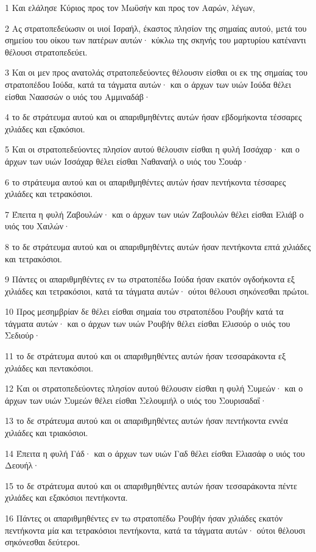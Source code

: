 \par 1 Και ελάλησε Κύριος προς τον Μωϋσήν και προς τον Ααρών, λέγων,
\par 2 Ας στρατοπεδεύωσιν οι υιοί Ισραήλ, έκαστος πλησίον της σημαίας αυτού, μετά του σημείου του οίκου των πατέρων αυτών· κύκλω της σκηνής του μαρτυρίου κατέναντι θέλουσι στρατοπεδεύει.
\par 3 Και οι μεν προς ανατολάς στρατοπεδεύοντες θέλουσιν είσθαι οι εκ της σημαίας του στρατοπέδου Ιούδα, κατά τα τάγματα αυτών· και ο άρχων των υιών Ιούδα θέλει είσθαι Ναασσών ο υιός του Αμμιναδάβ·
\par 4 το δε στράτευμα αυτού και οι απαριθμηθέντες αυτών ήσαν εβδομήκοντα τέσσαρες χιλιάδες και εξακόσιοι.
\par 5 Και οι στρατοπεδεύοντες πλησίον αυτού θέλουσιν είσθαι η φυλή Ισσάχαρ· και ο άρχων των υιών Ισσάχαρ θέλει είσθαι Ναθαναήλ ο υιός του Σουάρ·
\par 6 το στράτευμα αυτού και οι απαριθμηθέντες αυτών ήσαν πεντήκοντα τέσσαρες χιλιάδες και τετρακόσιοι.
\par 7 Έπειτα η φυλή Ζαβουλών· και ο άρχων των υιών Ζαβουλών θέλει είσθαι Ελιάβ ο υιός του Χαιλών·
\par 8 το δε στράτευμα αυτού και οι απαριθμηθέντες αυτών ήσαν πεντήκοντα επτά χιλιάδες και τετρακόσιοι.
\par 9 Πάντες οι απαριθμηθέντες εν τω στρατοπέδω Ιούδα ήσαν εκατόν ογδοήκοντα εξ χιλιάδες και τετρακόσιοι, κατά τα τάγματα αυτών· ούτοι θέλουσι σηκόνεσθαι πρώτοι.
\par 10 Προς μεσημβρίαν δε θέλει είσθαι σημαία του στρατοπέδου Ρουβήν κατά τα τάγματα αυτών· και ο άρχων των υιών Ρουβήν θέλει είσθαι Ελισούρ ο υιός του Σεδιούρ·
\par 11 το δε στράτευμα αυτού και οι απαριθμηθέντες αυτών ήσαν τεσσαράκοντα εξ χιλιάδες και πεντακόσιοι.
\par 12 Και οι στρατοπεδεύοντες πλησίον αυτού θέλουσιν είσθαι η φυλή Συμεών· και ο άρχων των υιών Συμεών θέλει είσθαι Σελουμιήλ ο υιός του Σουρισαδαΐ·
\par 13 το δε στράτευμα αυτού και οι απαριθμηθέντες αυτών ήσαν πεντήκοντα εννέα χιλιάδες και τριακόσιοι.
\par 14 Έπειτα η φυλή Γάδ· και ο άρχων των υιών Γαδ θέλει είσθαι Ελιασάφ ο υιός του Δεουήλ·
\par 15 το δε στράτευμα αυτού και οι απαριθμηθέντες αυτών ήσαν τεσσαράκοντα πέντε χιλιάδες και εξακόσιοι πεντήκοντα.
\par 16 Πάντες οι απαριθμηθέντες εν τω στρατοπέδω Ρουβήν ήσαν χιλιάδες εκατόν πεντήκοντα μία και τετρακόσιοι πεντήκοντα, κατά τα τάγματα αυτών· ούτοι θέλουσι σηκόνεσθαι δεύτεροι.

